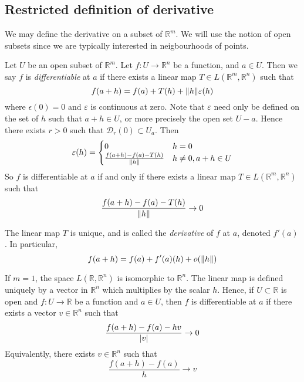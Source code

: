 \subsection{Restricted definition of derivative}
We may define the derivative on a subset of \( \mathbb R^m \).
We will use the notion of open subsets since we are typically interested in neigbourhoods of points.
\begin{definition}
	Let \( U \) be an open subset of \( \mathbb R^m \).
	Let \( f \colon U \to \mathbb R^n \) be a function, and \( a \in U \).
	Then we say \( f \) is \textit{differentiable} at \( a \) if there exists a linear map \( T \in L(\mathbb R^m, \mathbb R^n) \) such that
	\[
		f(a+h) = f(a) + T(h) + \norm{h} \varepsilon(h)
	\]
	where \( \epsilon(0) = 0 \) and \( \varepsilon \) is continuous at zero.
	Note that \( \varepsilon \) need only be defined on the set of \( h \) such that \( a + h \in U \), or more precisely the open set \( U - a \).
	Hence there exists \( r > 0 \) such that \( \mathcal D_r(0) \subset U_a \).
	Then
	\[
		\varepsilon(h) = \begin{cases}
			0                                     & h = 0                 \\
			\frac{f(a+h) - f(a) - T(h)}{\norm{h}} & h \neq 0, a + h \in U
		\end{cases}
	\]
	So \( f \) is differentiable at \( a \) if and only if there exists a linear map \( T \in L(\mathbb R^m, \mathbb R^n) \) such that
	\[
		\frac{f(a+h) - f(a) - T(h)}{\norm{h}} \to 0
	\]
\end{definition}
\begin{remark}
	The linear map \( T \) is unique, and is called the \textit{derivative} of \( f \) at \( a \), denoted \( f'(a) \).
	In particular,
	\[
		f(a+h) = f(a) + f'(a)(h) + o(\norm{h})
	\]
\end{remark}
\begin{remark}
	If \( m = 1 \), the space \( L(\mathbb R, \mathbb R^n) \) is isomorphic to \( \mathbb R^n \).
	The linear map is defined uniquely by a vector in \( \mathbb R^n \) which multiplies by the scalar \( h \).
	Hence, if \( U \subset \mathbb R \) is open and \( f \colon U \to \mathbb R \) be a function and \( a \in U \), then \( f \) is differentiable at \( a \) if there exists a vector \( v \in \mathbb R^n \) such that
	\[
		\frac{f(a+h) - f(a) - hv}{\abs{v}} \to 0
	\]
	Equivalently, there exists \( v \in \mathbb R^n \) such that
	\[
		\frac{f(a+h) - f(a)}{h} \to v
	\]
\end{remark}

